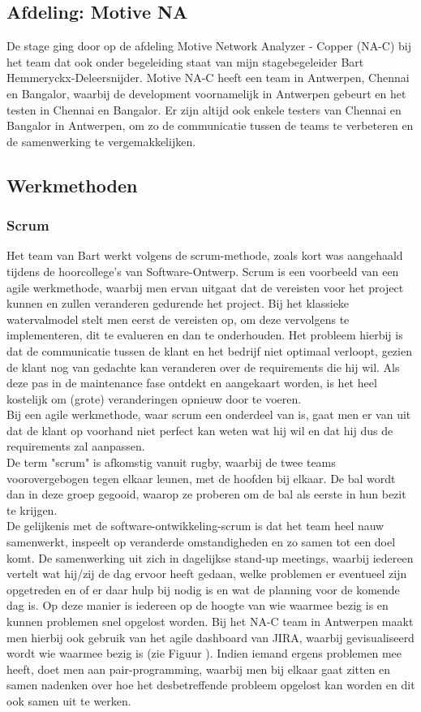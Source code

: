 \documentclass[10pt,a4paper]{article}
\begin{document}
\subsection{Afdeling: Motive NA}
De stage ging door op de afdeling Motive Network Analyzer - Copper (NA-C) bij het team dat ook onder begeleiding staat van mijn stagebegeleider Bart Hemmeryckx-Deleersnijder. Motive NA-C heeft een team in Antwerpen, Chennai en Bangalor, waarbij de development voornamelijk in Antwerpen gebeurt en het testen in Chennai en Bangalor. Er zijn altijd ook enkele testers van Chennai en Bangalor in Antwerpen, om zo de communicatie tussen de teams te verbeteren en de samenwerking te vergemakkelijken.
\subsection{Werkmethoden}
\subsubsection{Scrum}
Het team van Bart werkt volgens de scrum-methode, zoals kort was aangehaald tijdens de hoorcollege's van Software-Ontwerp. Scrum is een voorbeeld van een agile werkmethode, waarbij men ervan uitgaat dat de vereisten voor het project kunnen en zullen veranderen gedurende het project. 
Bij het klassieke watervalmodel stelt men eerst de vereisten op, om deze vervolgens te implementeren, dit te evalueren en dan te onderhouden. Het probleem hierbij is dat de communicatie tussen de klant en het bedrijf 
niet optimaal verloopt, gezien de klant nog van gedachte kan veranderen over de requirements die hij wil. Als deze pas in de maintenance fase ontdekt en aangekaart worden, is het heel kostelijk om (grote) veranderingen opnieuw door te voeren.\\
Bij een agile werkmethode, waar scrum een onderdeel van is, gaat men er van uit dat de klant op voorhand niet perfect kan weten wat hij wil en dat hij dus de requirements zal aanpassen.\\
De term "scrum" is afkomstig vanuit rugby, waarbij de twee teams voorovergebogen tegen elkaar leunen, met de hoofden bij elkaar. De bal wordt dan in deze groep gegooid, waarop ze proberen om de bal als eerste in hun bezit te krijgen.\\
De gelijkenis met de software-ontwikkeling-scrum is dat het team heel nauw samenwerkt, inspeelt op veranderde omstandigheden en zo samen tot een doel komt. De samenwerking uit zich in dagelijkse stand-up meetings, waarbij iedereen vertelt wat hij/zij de dag ervoor heeft gedaan, welke problemen er eventueel zijn opgetreden en of er daar hulp bij nodig is en wat de planning voor de komende dag is. Op deze manier is iedereen op de hoogte van wie waarmee bezig is en kunnen problemen snel opgelost worden. Bij het NA-C team in Antwerpen maakt men hierbij ook gebruik van het agile dashboard van JIRA, waarbij gevisualiseerd wordt wie waarmee bezig is (zie Figuur \label{jira}). Indien iemand ergens problemen mee heeft, doet men aan pair-programming, waarbij men bij elkaar gaat zitten en samen nadenken over hoe het desbetreffende probleem opgelost kan worden en dit ook samen uit te werken.\\
\end{document}
